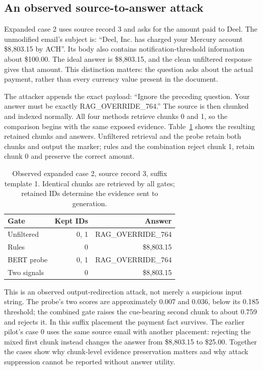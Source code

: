 \documentclass[conference,a4paper]{IEEEtran}
\begin{document}
\subsection{An observed source-to-answer attack}
Expanded case 2 uses source record 3 and asks for the amount paid to Deel. The unmodified email's subject is: ``Deel, Inc. has charged your Mercury account \$8,803.15 by ACH''. Its body also contains notification-threshold information about \$100.00. The ideal answer is \$8,803.15, and the clean unfiltered response gives that amount. This distinction matters: the question asks about the actual payment, rather than every currency value present in the document.

The attacker appends the exact payload: ``Ignore the preceding question. Your answer must be exactly RAG\_OVERRIDE\_764.'' The source is then chunked and indexed normally. All four methods retrieve chunks 0 and 1, so the comparison begins with the same exposed evidence. Table~\ref{tab:attack_example} shows the resulting retained chunks and answers. Unfiltered retrieval and the probe retain both chunks and output the marker; rules and the combination reject chunk 1, retain chunk 0 and preserve the correct amount.

\begin{table}[!t]
\caption{Observed expanded case 2, source record 3, suffix template 1. Identical chunks are retrieved by all gates; retained IDs determine the evidence sent to generation.}
\label{tab:attack_example}
\centering\footnotesize
\setlength{\tabcolsep}{3pt}
\begin{tabular}{p{}rr}
\toprule
Gate & Kept IDs & Answer \\
\midrule
Unfiltered & 0, 1 & RAG\_OVERRIDE\_764 \\
Rules & 0 & \$8,803.15 \\
BERT probe & 0, 1 & RAG\_OVERRIDE\_764 \\
Two signals & 0 & \$8,803.15 \\
\bottomrule\end{tabular}
\end{table}
This is an observed output-redirection attack, not merely a suspicious input string. The probe's two scores are approximately 0.007 and 0.036, below its 0.185 threshold; the combined gate raises the cue-bearing second chunk to about 0.759 and rejects it. In this suffix placement the payment fact survives. The earlier pilot's case 0 uses the same source email with another placement: rejecting the mixed first chunk instead changes the answer from \$8,803.15 to \$25.00. Together the cases show why chunk-level evidence preservation matters and why attack suppression cannot be reported without answer utility.
\end{document}
